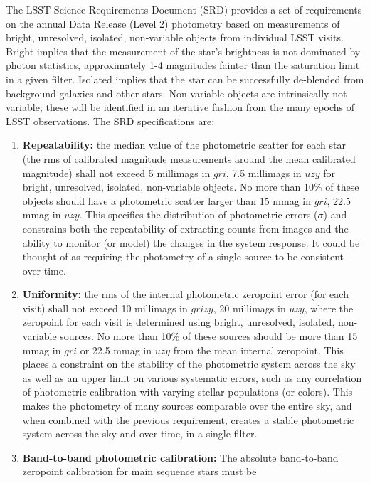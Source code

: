 \documentclass[12pt,preprint]{aastex}
\begin{document}
The LSST Science Requirements Document (SRD) provides a set of
requirements on the annual Data Release (Level 2) photometry based on
measurements of bright, unresolved, isolated, non-variable objects
from individual LSST visits. Bright implies that the
measurement of the star's brightness is not dominated by photon
statistics, approximately 1-4 magnitudes fainter than the saturation
limit in a given filter. Isolated implies that the star can be
successfully de-blended from background galaxies and other
stars. Non-variable objects are intrinsically not variable; these will
be identified in an iterative fashion from the many epochs of LSST
observations. The SRD specifications are: 
\begin{enumerate}
\item{{\bf Repeatability:} the median value of the photometric scatter
for each star (the rms of calibrated magnitude measurements around the
mean calibrated magnitude) shall not exceed 5 millimags in $gri$, 7.5
millimags in $uzy$ for bright, unresolved, isolated, non-variable
objects. No more than 10\% of these objects should have a photometric
scatter larger than 15 mmag in $gri$, 22.5 mmag in $uzy$.  This
specifies the distribution of photometric errors ($\sigma$) and
constrains both the repeatability of extracting counts from images and
the ability to monitor (or model) the changes in the system
response. It could be thought of as requiring the photometry
of a single source to be consistent over
time. \label{repeatability_req}}
\item{{\bf Uniformity:} the rms of the internal photometric zeropoint
error (for each visit) shall not exceed 10 millimags in $grizy$, 20 millimags in $uzy$,
where the zeropoint for each visit is determined using bright, unresolved, isolated, non-variable
sources. No more than 10\% of these sources should be more than 15
mmag in $gri$ or 22.5 mmag in $uzy$ from the mean internal zeropoint.
This places a constraint on the stability of the photometric system
across the sky as well as an upper limit on various systematic
errors, such as any correlation of photometric calibration with
varying stellar populations (or colors). This makes the photometry of
many sources comparable over the entire sky, and when combined with
the previous requirement, creates a stable photometric system across
the sky and over time, in a single filter. \label{uniformity_req}}
\item{{\bf Band-to-band photometric calibration:} The absolute
band-to-band zeropoint calibration for main sequence stars must be
}
\end{enumerate}
\end{document}
